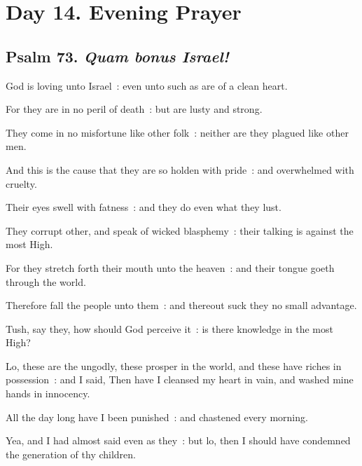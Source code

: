 \section*{Day 14. Evening Prayer}

\subsection{Psalm 73. \textit{Quam bonus Israel!}}


 God is loving unto Israel~: even unto such as are of a clean heart.\par
{}
For they are in no peril of death~: but are lusty and strong.\par
{}They come in no misfortune like other folk~: neither are they plagued like other men.\par
{}And this is the cause that they are so holden with pride~: and overwhelmed with cruelty.\par
{}Their eyes swell with fatness~: and they do even what they lust.\par
{}They corrupt other, and speak of wicked blasphemy~: their talking is against the most High.\par
{}For they stretch forth their mouth unto the heaven~: and their tongue goeth through the world.\par
{}Therefore fall the people unto them~: and thereout suck they no small advantage.\par
{}Tush, say they, how should God perceive it~: is there knowledge in the most High?\par
{}Lo, these are the ungodly, these prosper in the world, and these have riches in possession~: and I said, Then have I cleansed my heart in vain, and washed mine hands in innocency.\par
{}All the day long have I been punished~: and chastened every morning.\par
{}Yea, and I had almost said even as they~: but lo, then I should have condemned the generation of thy children.\par
